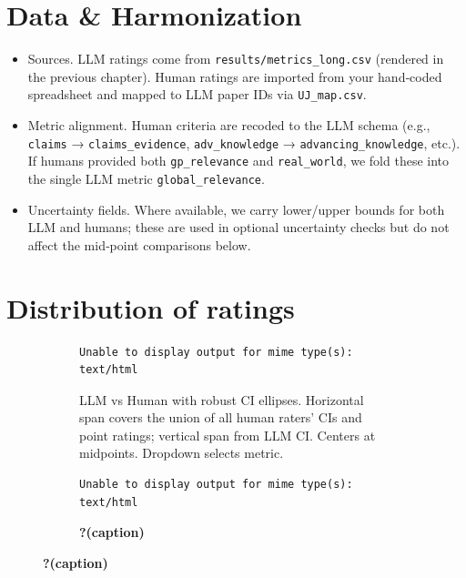 \documentclass[
  11pt,
  letterpaper,
  DIV=11,
  numbers=noendperiod]{scrreprt}
\providecommand{\tightlist}{%
  \setlength{\itemsep}{0pt}\setlength{\parskip}{0pt}}\usepackage{longtable,booktabs,array}
\begin{document}
\hypertarget{data-harmonization}{%
\section{Data \& Harmonization}\label{data-harmonization}}

\begin{itemize}
\tightlist
\item
  Sources. LLM ratings come from \texttt{results/metrics\_long.csv}
  (rendered in the previous chapter). Human ratings are imported from
  your hand‑coded spreadsheet and mapped to LLM paper IDs via
  \texttt{UJ\_map.csv}.\\
\item
  Metric alignment. Human criteria are recoded to the LLM schema (e.g.,
  \texttt{claims} → \texttt{claims\_evidence}, \texttt{adv\_knowledge} →
  \texttt{advancing\_knowledge}, etc.). If humans provided both
  \texttt{gp\_relevance} and \texttt{real\_world}, we fold these into
  the single LLM metric \texttt{global\_relevance}.\\
\item
  Uncertainty fields. Where available, we carry lower/upper bounds for
  both LLM and humans; these are used in optional uncertainty checks but
  do not affect the mid‑point comparisons below.
\end{itemize}

\hypertarget{distribution-of-ratings}{%
\section{Distribution of ratings}\label{distribution-of-ratings}}

\begin{figure}

\caption{\label{fig-scatter-ellipses}\textbf{?(caption)}}

\begin{figure}

\caption{LLM vs Human with robust CI ellipses. Horizontal span covers
the union of all human raters' CIs and point ratings; vertical span from
LLM CI. Centers at midpoints. Dropdown selects metric.}

\begin{verbatim}
Unable to display output for mime type(s): text/html
\end{verbatim}

\end{figure}

\begin{figure}

\caption{\textbf{?(caption)}}

\begin{verbatim}
Unable to display output for mime type(s): text/html
\end{verbatim}

\end{figure}

\end{figure}
\end{document}
